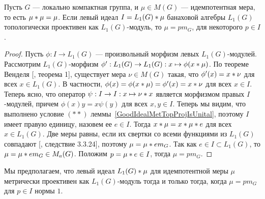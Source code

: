 \begin{proposition}\label{CommIdealByIdemMeasL1MetTopProjCharac} Пусть $G$ ---
локально компактная группа, и $\mu\in M(G)$ --- идемпотентная мера, то есть
$\mu\ast\mu=\mu$. Если левый идеал $I=L_1(G)\ast\mu$ банаховой алгебры
$L_1(G)$ топологически проективен как $L_1(G)$-модуль, то $\mu=p m_G$, для
некоторого $p\in I$.
\end{proposition}
\begin{proof} Пусть $\phi:I\to L_1(G)$ --- произвольный морфизм левых
$L_1(G)$-модулей. Рассмотрим $L_1(G)$-морфизм $\phi':L_1(G)\to
L_1(G):x\mapsto\phi(x\ast\mu)$. По теореме Венделя [\cite{WendLeftCentrzrs},
теорема 1], существует мера $\nu\in M(G)$ такая, что $\phi'(x)=x\ast\nu$ для
всех $x\in L_1(G)$. В частности,
$\phi(x)=\phi(x\ast\mu)=\phi'(x)=x\ast\nu$ для всех $x\in I$. Теперь ясно,
что оператор $\psi:I\to I:x\mapsto\nu\ast x$ является морфизмом правых
$I$-модулей, причем $\phi(x)y=x\psi(y)$ для всех $x,y\in I$. Теперь мы видим,
что выполнено условие $(**)$ леммы~\ref{GoodIdealMetTopProjIsUnital}, поэтому
$I$ имеет правую единицу, назовем ее $e\in I$. Тогда
$x\ast\mu=x\ast\mu\ast e$ для всех $x\in L_1(G)$. Две меры равны, если
их свертки со всеми функциями из $L_1(G)$ совпадают [\cite{DalBanAlgAutCont},
следствие 3.3.24], поэтому $\mu=\mu\ast e m_G$. Так как 
$e\in I\subset L_1(G)$, то $\mu=\mu\ast e m_G\in M_a(G)$. 
Положим $p=\mu\ast e\in I$, тогда $\mu=p m_G$.
\end{proof}

Мы предполагаем, что левый идеал $L_1(G)\ast \mu$ для идемпотентной меры
$\mu$ метрически проективен как $L_1(G)$-модуль тогда и только тогда, когда
$\mu=p m_G$ для $p\in I$ нормы $1$.

